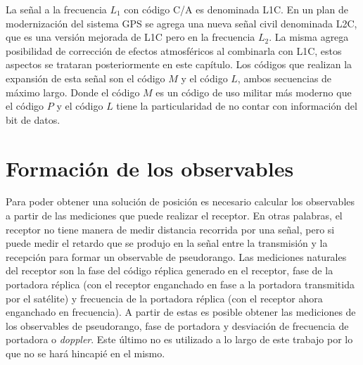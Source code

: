 \documentclass[a4paper,12pt,oneside,onecolumn,final,openright]{book}%
\begin{document}
	La señal a la frecuencia $L_1$ con código C/A es denominada L1C. En un plan de modernización del sistema GPS se agrega una nueva señal civil denominada L2C, que es una versión mejorada de L1C pero en la frecuencia $L_2$. La misma agrega posibilidad de corrección de efectos atmosféricos al combinarla con L1C, estos aspectos se trataran posteriormente en este capítulo. Los códigos que realizan la expansión de esta señal son el código $M$ y el código $L$, ambos secuencias de máximo largo. Donde el código $M$ es un código de uso militar más moderno que el código $P$ y el código $L$ tiene la particularidad de no contar con información del bit de datos.
\section{Formación de los observables}\label{sec:observables}
	  Para poder obtener una solución de posición es necesario calcular los observables a partir de las mediciones que puede realizar el receptor. En otras palabras, el receptor no tiene manera de medir distancia recorrida por una señal, pero si puede medir el retardo que se produjo en la señal entre la transmisión y la recepción para formar un observable de pseudorango. Las mediciones naturales del receptor son la fase del código réplica generado en el receptor, fase de la portadora réplica (con el receptor enganchado en fase a la portadora transmitida por el satélite) y frecuencia de la portadora réplica (con el receptor ahora enganchado en frecuencia). A partir de estas es posible obtener las mediciones de los observables de pseudorango, fase de portadora y desviación de frecuencia de portadora o \textit{doppler}. Este último no es utilizado a lo largo de este trabajo por lo que no se hará hincapié en el mismo.
	
\end{document}
